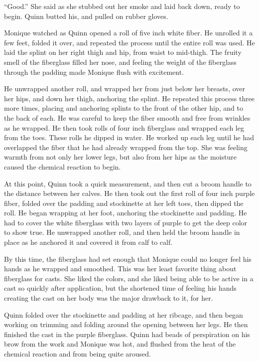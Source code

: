 ``Good.'' She said as she stubbed out her smoke and laid back down, ready to begin. Quinn
butted his, and pulled on rubber gloves.

\begin{thought}
Monique watched as Quinn opened a roll of five inch white fiber. He unrolled it a few feet,
folded it over, and repeated the process until the entire roll was used. He laid the splint on
her right thigh and hip, from waist to mid-thigh. The fruity smell of the fiberglass filled her
nose, and feeling the weight of the fiberglass through the padding made Monique flush with
excitement.

He unwrapped another roll, and wrapped her from just below her breasts, over her hips, and
down her thigh, anchoring the splint. He repeated this process three more times, placing and
anchoring splints to the front of the other hip, and to the back of each. He was careful to keep
the fiber smooth and free from wrinkles as he wrapped. He then took rolls of four inch
fiberglass and wrapped each leg from the toes. These rolls he dipped in water. He worked up each
leg until he had overlapped the fiber that he had already wrapped from the top. She was feeling
warmth from not only her lower legs, but also from her hips as the moisture caused the chemical
reaction to begin.

At this point, Quinn took a quick measurement, and then cut a broom handle to the distance
between her calves. He then took out the first roll of four inch purple fiber, folded over the
padding and stockinette at her left toes, then dipped the roll. He began wrapping at her foot,
anchoring the stockinette and padding. He had to cover the white fiberglass with two layers of
purple to get the deep color to show true. He unwrapped another roll, and then held the broom
handle in place as he anchored it and covered it from calf to calf.

By this time, the fiberglass had set enough that Monique could no longer feel his hands as
he wrapped and smoothed. This was her least favorite thing about fiberglass for casts. She liked
the colors, and she liked being able to be active in a cast so quickly after application, but
the shortened time of feeling his hands creating the cast on her body was the major drawback to
it, for her.

Quinn folded over the stockinette and padding at her ribcage, and then began working on
trimming and folding around the opening between her legs. He then finished the cast in the
purple fiberglass. Quinn had beads of perspiration on his brow from the work and Monique was
hot, and flushed from the heat of the chemical reaction and from being quite aroused.
\end{thought}

